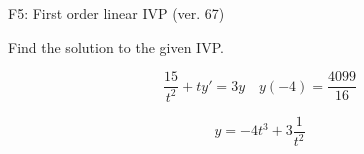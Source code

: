 \begin{exercise}
  \begin{exerciseTitle}F5: First order linear IVP (ver. 67)\end{exerciseTitle}
  \begin{exerciseStatement}
    
Find the solution to the given IVP.

    
\[\frac{15}{t^{2}} +ty'= 3 y \hspace{1em} y( -4 ) = \frac{4099}{16}\]

  \end{exerciseStatement}
  \begin{exerciseAnswer}
    
\[y= -4 t^ 3 +3 \frac{1}{t^{2}}\]

  \end{exerciseAnswer}
\end{exercise}